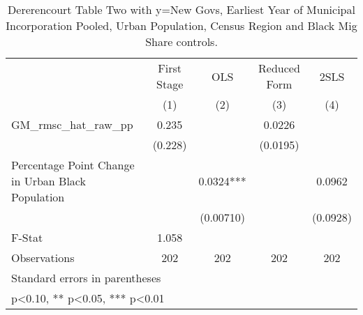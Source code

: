 \begin{table}[htbp]\centering
\def\sym#1{\ifmmode^{#1}\else\(^{#1}\)\fi}
\caption{Dererencourt Table Two with y=New Govs, Earliest Year of Municipal Incorporation Pooled, Urban Population, Census Region and Black Mig Share controls.}
\begin{tabular}{l*{4}{c}}
\toprule
                    & First Stage   &         OLS   &Reduced Form   &        2SLS   \\
                    &\multicolumn{1}{c}{(1)}   &\multicolumn{1}{c}{(2)}   &\multicolumn{1}{c}{(3)}   &\multicolumn{1}{c}{(4)}   \\
\midrule
GM\_rmsc\_hat\_raw\_pp  &       0.235   &               &      0.0226   &               \\
                    &     (0.228)   &               &    (0.0195)   &               \\
\addlinespace
Percentage Point Change in Urban Black Population&               &      0.0324***&               &      0.0962   \\
                    &               &   (0.00710)   &               &    (0.0928)   \\
\midrule
F-Stat              &       1.058   &               &               &               \\
Observations        &         202   &         202   &         202   &         202   \\
\bottomrule
\multicolumn{5}{l}{\footnotesize Standard errors in parentheses}\\
\multicolumn{5}{l}{\footnotesize * p<0.10, ** p<0.05, *** p<0.01}\\
\end{tabular}
\end{table}
